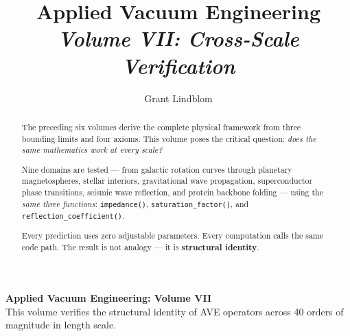 \title{\textbf{Applied Vacuum Engineering} \\ \large \textit{Volume VII: Cross-Scale Verification}}
\author{Grant Lindblom}
\date{}

\maketitle

\vfill
\noindent\textbf{Applied Vacuum Engineering: Volume VII} \\
This volume verifies the structural identity of AVE operators across 40 orders of magnitude in length scale.

\begin{abstract}
    The preceding six volumes derive the complete physical framework from three bounding limits and four axioms. This volume poses the critical question: \textit{does the same mathematics work at every scale?}

    Nine domains are tested --- from galactic rotation curves through planetary magnetospheres, stellar interiors, gravitational wave propagation, superconductor phase transitions, seismic wave reflection, and protein backbone folding --- using the \textit{same three functions}: \texttt{impedance()}, \texttt{saturation\_factor()}, and \texttt{reflection\_coefficient()}.

    Every prediction uses zero adjustable parameters. Every computation calls the same code path. The result is not analogy --- it is \textbf{structural identity}.
\end{abstract}
